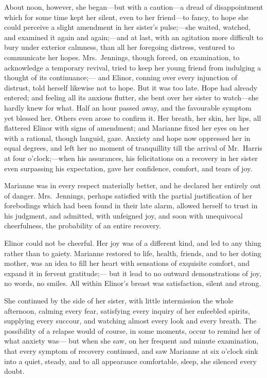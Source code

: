 \documentclass{article}
\begin{document}
About noon, however, she began---but with a caution---a
dread of disappointment which for some time kept her silent,
even to her friend---to fancy, to hope she could perceive
a slight amendment in her sister's pulse;---she waited,
watched, and examined it again and again;---and at last,
with an agitation more difficult to bury under exterior calmness,
than all her foregoing distress, ventured to communicate
her hopes.  Mrs.\ Jennings, though forced, on examination,
to acknowledge a temporary revival, tried to keep her
young friend from indulging a thought of its continuance;---%
and Elinor, conning over every injunction of distrust,
told herself likewise not to hope.  But it was too late.
Hope had already entered; and feeling all its anxious flutter,
she bent over her sister to watch---she hardly knew for what.
Half an hour passed away, and the favourable symptom
yet blessed her.  Others even arose to confirm it.
Her breath, her skin, her lips, all flattered Elinor
with signs of amendment; and Marianne fixed her eyes on
her with a rational, though languid, gaze.  Anxiety and
hope now oppressed her in equal degrees, and left her no
moment of tranquillity till the arrival of Mr.\ Harris at
four o'clock;---when his assurances, his felicitations on
a recovery in her sister even surpassing his expectation,
gave her confidence, comfort, and tears of joy.

Marianne was in every respect materially better,
and he declared her entirely out of danger.  Mrs.\ Jennings,
perhaps satisfied with the partial justification of her
forebodings which had been found in their late alarm,
allowed herself to trust in his judgment, and admitted,
with unfeigned joy, and soon with unequivocal cheerfulness,
the probability of an entire recovery.

Elinor could not be cheerful.  Her joy was of a
different kind, and led to any thing rather than to gaiety.
Marianne restored to life, health, friends, and to her
doting mother, was an idea to fill her heart with sensations
of exquisite comfort, and expand it in fervent gratitude;---%
but it lead to no outward demonstrations of joy, no words,
no smiles.  All within Elinor's breast was satisfaction,
silent and strong.

She continued by the side of her sister, with little
intermission the whole afternoon, calming every fear,
satisfying every inquiry of her enfeebled spirits,
supplying every succour, and watching almost every look and
every breath.  The possibility of a relapse would of course,
in some moments, occur to remind her of what anxiety was---%
but when she saw, on her frequent and minute examination,
that every symptom of recovery continued, and saw Marianne
at six o'clock sink into a quiet, steady, and to all
appearance comfortable, sleep, she silenced every doubt.
\end{document}
